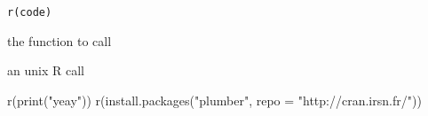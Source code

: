 \documentclass[a4paper]{book}
\begin{document}
%
\begin{Usage}
\begin{verbatim}
r(code)
\end{verbatim}
\end{Usage}
%
\begin{Arguments}
\begin{ldescription}
\item[\code{code}] the function to call
\end{ldescription}
\end{Arguments}
%
\begin{Value}
an unix R call
\end{Value}
%
\begin{Examples}
\begin{ExampleCode}
r(print("yeay"))
r(install.packages("plumber", repo = "http://cran.irsn.fr/"))
\end{ExampleCode}
\end{Examples}
\printindex{}
\end{document}

